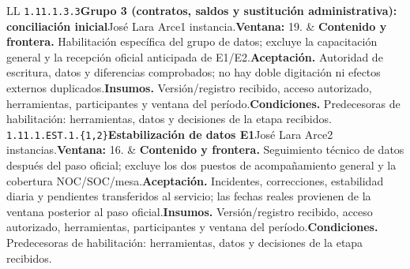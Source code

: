 \begin{longtable}{L{\tabcolsep\relax}L{\tabcolsep\relax}}
\texttt{1.\allowbreak{}11.\allowbreak{}1.\allowbreak{}3.\allowbreak{}3}\newline{}\textbf{Grupo 3 (contratos, saldos y sustitución administrativa): conciliación inicial}\newline{}José Lara Arce\newline{}1 instancia.\newline{}\textbf{Ventana:} 19. & \textbf{Contenido y frontera.} Habilitación específica del grupo de datos; excluye la capacitación general y la recepción oficial anticipada de E1/E2.\newline{}\textbf{Aceptación.} Autoridad de escritura, datos y diferencias comprobados; no hay doble digitación ni efectos externos duplicados.\newline{}\textbf{Insumos.} Versión/registro recibido, acceso autorizado, herramientas, participantes y ventana del período.\newline{}\textbf{Condiciones.} Predecesoras de habilitación: herramientas, datos y decisiones de la etapa recibidos.\\\hline
\texttt{1.\allowbreak{}11.\allowbreak{}1.\allowbreak{}EST.\allowbreak{}1.\allowbreak{}\{1,\allowbreak{}2\}}\newline{}\textbf{Estabilización de datos E1}\newline{}José Lara Arce\newline{}2 instancias.\newline{}\textbf{Ventana:} 16. & \textbf{Contenido y frontera.} Seguimiento técnico de datos después del paso oficial; excluye los dos puestos de acompañamiento general y la cobertura NOC/SOC/mesa.\newline{}\textbf{Aceptación.} Incidentes, correcciones, estabilidad diaria y pendientes transferidos al servicio; las fechas reales provienen de la ventana posterior al paso oficial.\newline{}\textbf{Insumos.} Versión/registro recibido, acceso autorizado, herramientas, participantes y ventana del período.\newline{}\textbf{Condiciones.} Predecesoras de habilitación: herramientas, datos y decisiones de la etapa recibidos.\\\hline

\end{longtable}
